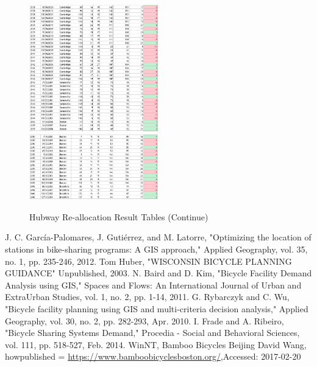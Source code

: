 \documentclass[journal, letterpaper]{IEEEtran}
\begin{document}
\begin{figure}
  \includegraphics[width=0.5\textwidth]{reall3.png}
  \includegraphics[width=0.5\textwidth]{reall4.png}
  \caption{Hubway Re-allocation Result Tables (Continue)}
  \label{fig:5}
\end{figure}

\begin{thebibliography}{99}

 J. C. García-Palomares, J. Gutiérrez, and M. Latorre, "Optimizing the location of stations in bike-sharing programs: A GIS approach," Applied Geography, vol. 35, no. 1, pp. 235-246, 2012.
 Tom Huber, "WISCONSIN BICYCLE PLANNING GUIDANCE" Unpublished, 2003.
 N. Baird and D. Kim, "Bicycle Facility Demand Analysis using GIS," Spaces and Flows: An International Journal of Urban and ExtraUrban Studies, vol. 1, no. 2, pp. 1-14, 2011.
 G. Rybarczyk and C. Wu, "Bicycle facility planning using GIS and multi-criteria decision analysis," Applied Geography, vol. 30, no. 2, pp. 282-293, Apr. 2010.
 I. Frade and A. Ribeiro, "Bicycle Sharing Systems Demand," Procedia - Social and Behavioral Sciences, vol. 111, pp. 518-527, Feb. 2014.
 {WinNT, {{ Bamboo Bicycles Beijing} David Wang}, howpublished = {\url{https://www.bamboobicyclesboston.org/}},{Accessed: 2017-02-20}}

\end{thebibliography}
\end{document}
